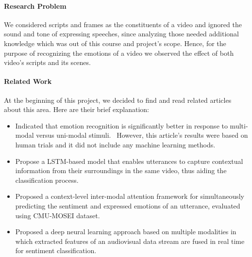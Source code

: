 \paragraph{Research Problem} We considered scripts and frames as the constituents of a video and ignored the sound and tone of expressing speeches, since analyzing those needed additional knowledge which was out of this course and project's scope. Hence, for the purpose of recognizing the emotions of a video we observed the effect of both video's scripts and its scenes. %


\paragraph{Related Work} At the beginning of this project, we decided to find and read related articles about this area. Here are their brief explanation:
\begin{itemize}
\item Indicated that emotion recognition is significantly better in response to multi-modal versus uni-modal stimuli.~\cite{paulmann2011there} However, this article's results were based on human trials and it did not include any machine learning methods.
\item Propose a LSTM-based model that enables utterances to capture contextual information from their surroundings in the same video, thus aiding the classification process.~\cite{poria2017context}
\item Proposed a context-level inter-modal attention framework for simultaneously predicting the sentiment and expressed emotions of an utterance, evaluated using CMU-MOSEI dataset.~\cite{shenoy2020multilogue}
\item Proposed a deep neural learning approach based on multiple modalities in which extracted features of an audiovisual data stream are fused in real time for sentiment classification.~\cite{yakaew2021multimodal}
\end{itemize}


